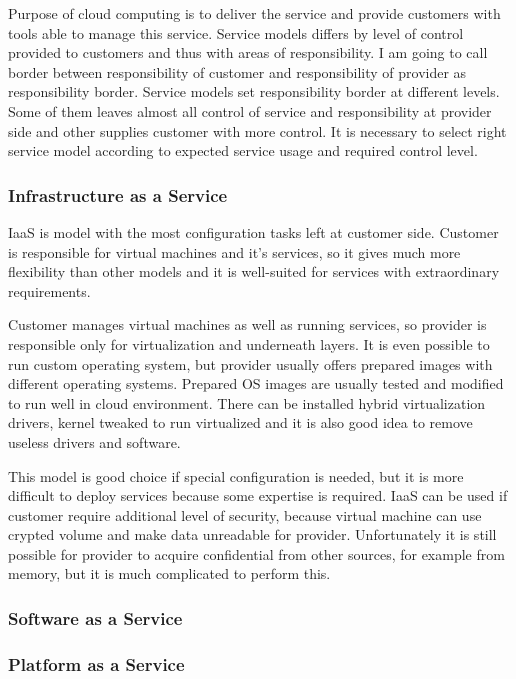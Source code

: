 
Purpose of cloud computing is to deliver the service and provide customers with tools able to manage this service. Service models differs by level of control provided to customers and thus with areas of responsibility. I am going to call border between responsibility of customer and responsibility of provider as responsibility border. 
Service models set responsibility border at different levels. Some of them leaves almost all control of service and responsibility at provider side and other supplies customer with more control. It is necessary to select right service model according to expected service usage and required control level.

\subsubsection{Infrastructure as a Service}
\Ac{IaaS} is model with the most configuration tasks left at customer side. Customer is responsible for virtual machines and it's services, so it gives much more flexibility than other models and it is well-suited for services with extraordinary requirements. 

Customer manages virtual machines as well as running services, so provider is responsible only for virtualization and underneath layers. It is even possible to run custom operating system, but provider usually offers prepared images with different operating systems. Prepared \Ac{OS} images are usually tested and modified to run well in cloud environment. There can be installed hybrid virtualization drivers, kernel tweaked to run virtualized and it is also good idea to remove useless drivers and software. 

This model is good choice if special configuration is needed, but it is more difficult to deploy services because some expertise is required. \Ac{IaaS} can be used if customer require additional level of security, because virtual machine can use crypted volume and make data unreadable for provider. Unfortunately it is still possible for provider to acquire confidential from other sources, for example from memory, but it is much complicated to perform this.

\subsubsection{Software as a Service}

\subsubsection{Platform as a Service}
